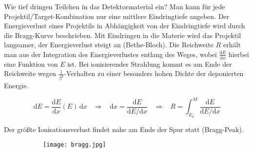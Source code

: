 \FloatBarrier
Wie tief dringen Teilchen in das Detektormaterial ein? Man kann für jede
Projektil/Target-Kombination nur eine mittlere Eindringtiefe angeben. Der Energieverlust eines
Projektils in Abhängigkeit von der Eindringtiefe wird durch die Bragg-Kurve beschrieben. Mit
Eindringen in die Materie wird das Projektil langsamer, der Energieverlust steigt an
(Bethe-Bloch). Die Reichweite $R$ erhält man aus der Integration des Energieverlustes entlang des
Weges, wobei $\frac{\mathrm{d}E}{\mathrm{d}x}$ hierbei eine Funktion von $E$ ist. Bei ionisierender Strahlung kommt es
am Ende der Reichweite wegen $\frac{1}{\beta^2}$-Verhalten zu einer besonders hohen Dichte der
deponierten Energie.

\[\mathrm{d}E= \frac{\mathrm{d}E}{\mathrm{d}x}(E)\,\mathrm{d}x~~~~\Rightarrow~~~~\mathrm{d}x
=\frac{\mathrm{d}E}{\mathrm{d}E/\mathrm{d}x}~~~~\Rightarrow~~~~ R=\int_{E_0}^{M} \frac{\mathrm{d}E}{\mathrm{d}E/\mathrm{d}x}  \]

Der größte Ionisationsverlust findet nahe am Ende der Spur statt (Bragg-Peak).




% 
% 

\begin{figure}[htbp]
	\begin{minipage}[b]{0.5\textwidth}
		\begin{figure}[H]
		\centering
		\texttt{[image: bragg.jpg]}
		\end{figure}
	\end{minipage}
	\hfill 
	\begin{minipage}[b]{0.5\textwidth}
		\begin{figure}[H]
		\centering
		
		\end{figure}
	\end{minipage} 
\end{figure}

\FloatBarrier